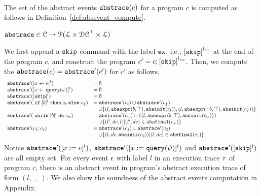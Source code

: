\\
The set of the abstract events $\mathtt{abs}{\mathtt{trace}}(c)$ for a program $c$
is computed as follows in Definition~\ref{def:absevent_compute}.
 \begin{defn}
 \label{def:absevent_compute}
  $\mathtt{abs}{\mathtt{trace}} \in \mathcal{C} \to \mathcal{P}( \mathcal{L} \times \mathcal{DC}^{\top} \times \mathcal{L} )$
  \end{defn}
 We first append a $\mathtt{skip}$ command with 
the label $\mathtt{ex}$, i.e., $\clabel{\eskip}^{l_{ex}}$ at the end of the program $c$, and construct 
the program $c' = c;\clabel{\eskip}^{l_{ex}}$.
Then, we compute the $\mathtt{abs}{\mathtt{trace}}(c) = \mathtt{abs}{\mathtt{trace}}'(c')$ for $c'$ as follows,
 {\footnotesize
 \[
   \begin{array}{ll}
      \absflow'(\clabel{\assign{x}{\expr}}{}^l)  & = \emptyset  \\
      \absflow'(\clabel{\assign{x}{\query(\qexpr)}}{}^l)  & = \emptyset  \\
      \absflow'([\eskip]^{l})  & = \emptyset \\
      \absflow'(\eif [b]^l \ethen c_t \eelse c_f)  & =  \absflow'(c_t) \cup \absflow'(c_f)
        \\ & \quad 
        \cup \{(l, \absexpr(\bexpr, \top),  \absinit(c_t) ) ,  (l, \absexpr(\neg\bexpr, \top), \absinit(c_f)) \} \\
       \absflow'(\ewhile [b]^l \edo c_w)  & =  \absflow'(c_w) \cup \{(l, \absexpr(\bexpr, \top), \absinit(c_w)) \} 
       \\ & \quad 
       \cup \{(l', dc, l)| (l', dc) \in \absfinal(c_w) \} \\
       \absflow'(c_1 ; c_2)  & = \absflow'(c_1) \cup  \absflow'(c_2) 
       \\ & \quad 
       \cup \{ (l, dc, \absinit(c_2)) | (l, dc) \in \absfinal(c_1) \} \\
   \end{array}
   \]
   }
   Notice $\mathtt{abs}{\mathtt{trace}}'([x := e]^{l})$, $\mathtt{abs}{\mathtt{trace}}'([x := {\tt query}(\psi)]^{l})$ and $\mathtt{abs}{\mathtt{trace}}'([\mathtt{skip}]^{l})$ are all empty set. 
   For every event $\mathtt{\epsilon}$ with label $l$ in an execution trace $\mathtt{\tau}$ of program $c$, 
   there is an abstract event in program's abstract execution trace of form $(l, \_, \_)$.  
   We also show the soundness of the abstract events computation in Appendix.


